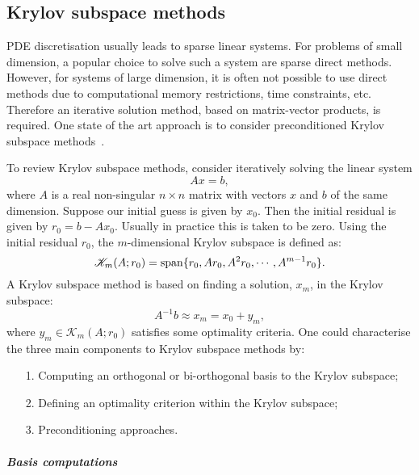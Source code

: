 \documentclass[msc,oneside]{ubcthesis}
\numberwithin{equation}{chapter}    %
\begin{document}
\begin{appendices}
\chapter{Krylov subspace methods}

PDE discretisation usually leads to sparse linear systems. For problems of small dimension, a popular choice to solve such a system are sparse direct methods. However, for systems of large dimension, it is often not possible to use direct methods due to computational memory restrictions, time constraints, etc. Therefore an iterative solution method, based on matrix-vector products, is required. One state of the art  approach is to consider preconditioned Krylov subspace methods~\cite{saad2003iterative}.

To review Krylov subspace methods, consider iteratively solving the linear system
$$Ax = b,$$
where $A$ is a real non-singular $n \times n$ matrix with vectors $x$ and $b$ of the same dimension. Suppose our initial guess is given by $x_0$. Then the initial residual is given by $r_0=b-Ax_0$. Usually in practice this is taken to be zero. Using the initial residual $r_0$,  the $m$-dimensional Krylov subspace is defined as:
$$\mathscr{K}_m(A;r_0) = {\rm span}\{r_0,Ar_0,A^2r_0, \cdots ,A^{m-1}r_0\}.$$
A Krylov subspace method is based on finding a solution, $x_m$,  in the Krylov subspace:
$$A^{-1}b  \approx x_m = x_0+y_m,$$
where $y_m\in\mathscr{K}_m(A;r_0)$ satisfies some optimality criteria. One could characterise the three main components to  Krylov subspace methods by:
\begin{itemize}
    \item[1.] Computing an orthogonal or bi-orthogonal basis to the Krylov subspace;
    \item[2.] Defining an optimality criterion within the Krylov subspace;
    \item[3.] Preconditioning approaches.
\end{itemize}

\paragraph{Basis computations} ~\\

\vspace{-5mm}




\end{appendices}
\end{document}
